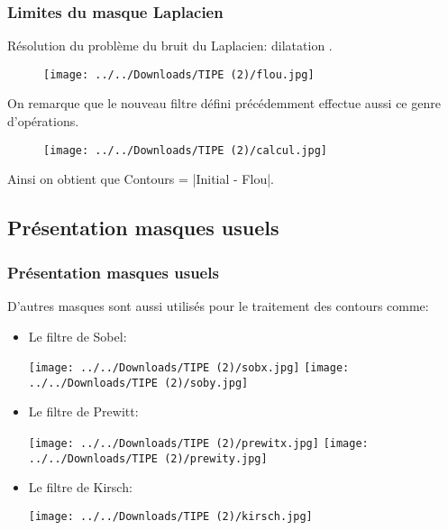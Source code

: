 \documentclass{beamer}
\begin{document}
\begin{frame}
\frametitle{Limites du masque Laplacien}

Résolution du problème du bruit du Laplacien: dilatation .
\begin{figure}
\texttt{[image: ../../Downloads/TIPE (2)/flou.jpg]}
\end{figure}

On remarque que le nouveau filtre défini précédemment effectue aussi ce genre d'opérations.

\begin{figure}
\texttt{[image: ../../Downloads/TIPE (2)/calcul.jpg]}
\end{figure}

Ainsi on obtient que Contours = |Initial - Flou|.

\end{frame}

\subsection{Présentation masques usuels}
\begin{frame}
\frametitle{Présentation masques usuels}

D'autres masques sont aussi utilisés pour le traitement des contours comme:


\begin{itemize}
\item Le filtre de Sobel:

\texttt{[image: ../../Downloads/TIPE (2)/sobx.jpg]} \texttt{[image: ../../Downloads/TIPE (2)/soby.jpg]}

\item Le filtre de Prewitt:

\texttt{[image: ../../Downloads/TIPE (2)/prewitx.jpg]} \texttt{[image: ../../Downloads/TIPE (2)/prewity.jpg]}


\item Le filtre de Kirsch:

\texttt{[image: ../../Downloads/TIPE (2)/kirsch.jpg]}

\end{itemize}
\end{frame}
\end{document}
